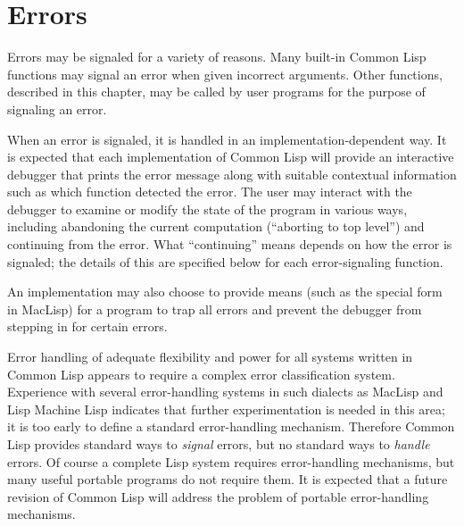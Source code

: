 
\clearpage\def\pagestatus{FINAL PROOF}

\chapter{Errors}
\label{XERROR}

Errors may be signaled for a variety of reasons.
Many built-in Common Lisp functions may signal an error when given incorrect
arguments.  Other functions, described in this chapter,
may be called by user programs for the purpose of signaling
an error.

When an error is signaled, it is
handled in an implementation-dependent way.  It is expected
that each implementation of Common Lisp will provide an interactive debugger that
prints the error message along with suitable contextual information
such as which function detected the error.  The user may interact with
the debugger to examine or modify the state of the program in various
ways, including abandoning the current computation (``aborting to top
level'') and continuing from the error.  What ``continuing'' means
depends on how the error is signaled; the details of this are specified below
for each error-signaling function.

\begin{obsolete}
An implementation may also choose to provide means (such as the
 special form in MacLisp) for a program to trap
all errors and prevent the debugger from stepping in for
certain errors.

\beforenoterule
\begin{rationale}
Error handling of adequate
flexibility and power for all systems written in Common Lisp appears to
require a complex error classification system.
Experience with several error-handling systems
in such dialects as MacLisp and Lisp Machine Lisp indicates that
further experimentation is needed in this area;
it is too early to define a standard error-handling mechanism.
Therefore Common Lisp provides standard ways to {\it signal} errors,
but no standard ways to {\it handle} errors.
Of course a
complete Lisp system requires error-handling mechanisms, but many useful
portable programs do not require them.  It is expected that a future
revision of Common Lisp will address the problem of portable error-handling
mechanisms.
\end{rationale}
\afternoterule
\end{obsolete}

